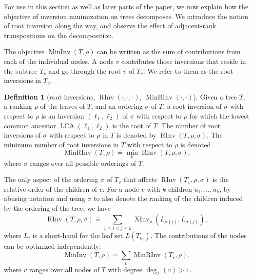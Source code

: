 \documentclass[11pt]{article}
\numberwithin{equation}{section}
\theoremstyle{definition}
\newtheorem{definition}[theorem]{Definition}
\theoremstyle{plain}
\DeclareMathOperator{\LCA}{LCA}
\newcommand{\ranking}{\rho}
\newcommand{\ordering}{\sigma}
\DeclareMathOperator{\XInv}{XInv}
\DeclareMathOperator{\MInv}{MinInv}
\DeclareMathOperator{\MRInv}{MinRInv}
\DeclareMathOperator{\RInv}{RInv}
\begin{document}
For use in this section as well as later parts of the paper, we now explain how the objective of inversion minimization on trees decomposes. We introduce the notion of root inversion along the way, and observe the effect of adjacent-rank transpositions on the decomposition.

The objective $\MInv(T,\ranking)$ can be written as the sum of contributions from each of the individual nodes. A node $v$ contributes those inversions that reside in the subtree $T_v$ and go through the root $v$ of $T_v$. We refer to them as the root inversions in $T_v$. 
\begin{definition}[root inversions, $\RInv(\cdot,\cdot,\cdot)$, $\MRInv(\cdot,\cdot)$]
Given a tree $T$, a ranking $\ranking$ of the leaves of $T$, and an ordering $\ordering$ of $T$, a root inversion of $\ordering$ with respect to $\ranking$ is an inversion $(\ell_1,\ell_2)$ of $\ordering$ with respect to $\ranking$ for which the lowest common ancestor $\LCA(\ell_1,\ell_2)$ is the root of $T$. The number of root inversions of $\ordering$ with respect to $\ranking$ in $T$ is denoted by $\RInv(T,\ranking,\ordering)$. The minimum number of root inversions in $T$ with respect to $\ranking$ is denoted 
\begin{equation}\label{eq:MRInv}
\MRInv(T,\ranking) \doteq \min_\ordering \RInv(T,\ranking,\ordering),
\end{equation}
where $\ordering$ ranges over all possible orderings of $T$.
\end{definition}
The only aspect of the ordering $\ordering$ of $T_v$ that affects $\RInv(T_v,\ranking,\ordering)$ is the relative order of the children of $v$. For a node $v$ with $k$ children $u_1,\dots,u_k$, by abusing notation and using $\ordering$ to also denote the ranking of the children induced by the ordering of the tree, we have
\begin{equation}\label{eq:cost}
\RInv(T,\ranking,\ordering) \doteq \sum_{1 \le i < j \le k} \XInv_\ranking(L_{\ordering(i)},L_{\ordering(j)}),
\end{equation}
where $L_i$ is a short-hand for the leaf set $L(T_{u_i})$. The contributions of the nodes can be optimized independently:
\begin{equation}\label{eq:MInv:decomposition}
\MInv(T,\ranking) = \sum_v \MRInv(T_v,\ranking),
\end{equation}
where $v$ ranges over all nodes of $T$ with degree $\deg_T(v)>1$. 
\end{document}
